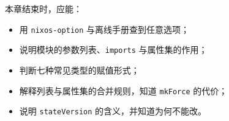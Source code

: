 \begin{checkpoint}
本章结束时，应能：
\begin{itemize}
  \item 用 \texttt{nixos-option} 与离线手册查到任意选项；
  \item 说明模块的参数列表、\texttt{imports} 与属性集的作用；
  \item 判断七种常见类型的赋值形式；
  \item 解释列表与属性集的合并规则，知道 \texttt{mkForce} 的代价；
  \item 说明 \texttt{stateVersion} 的含义，并知道为何不能改。
\end{itemize}
\end{checkpoint}
